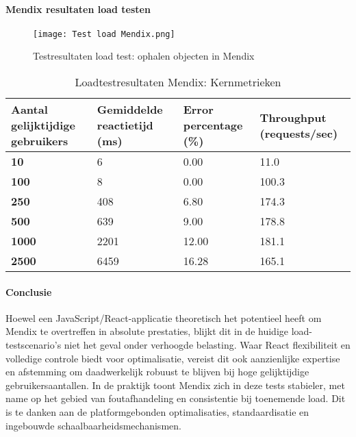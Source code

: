 \paragraph{Mendix resultaten load testen}

\begin{figure}[H]
    \centering
    \captionsetup{justification=centering}
    \texttt{[image: Test load Mendix.png]}
    \caption[\centering Testresultaten load test: ophalen objecten in Mendix]{\label{fig:loadtest-Mendix} Testresultaten load test: ophalen objecten in Mendix}
\end{figure}


\begin{table}[h]
    \centering
    \begin{tabular}{ |p{5cm}|p{3cm}|p{3cm}|p{3cm}|}
        \hline
        \textbf{Aantal gelijktijdige \newline gebruikers} & \textbf{Gemiddelde reactietijd (ms)} & \textbf{Error \newline percentage (\%)} & \textbf{Throughput (requests/sec)}\\
        \hline
        \textbf{10}  & 6 & 0.00 & 11.0 \\
        \hline
        \textbf{100} & 8 & 0.00 & 100.3 \\
        \hline
        \textbf{250}  & 408 & 6.80 & 174.3 \\
        \hline
        \textbf{500}  & 639 & 9.00 & 178.8 \\
        \hline                       
        \textbf{1000}  & 2201 & 12.00 & 181.1  \\
        \hline
        \textbf{2500}  & 6459 & 16.28 & 165.1 \\
        \hline
    \end{tabular}
    \caption[\centering Loadtestresultaten Mendix: Kernmetrieken]{\label{tab:Testresultaten Mendix loadtest}Loadtestresultaten Mendix: Kernmetrieken}
\end{table}



\paragraph{Conclusie}
Hoewel een JavaScript/React-applicatie theoretisch het potentieel heeft om Mendix te overtreffen in absolute prestaties, blijkt dit in de huidige load-testscenario’s niet het geval onder verhoogde belasting. Waar React flexibiliteit en volledige controle biedt voor optimalisatie, vereist dit ook aanzienlijke expertise en afstemming om daadwerkelijk robuust te blijven bij hoge gelijktijdige gebruikersaantallen. In de praktijk toont Mendix zich in deze tests stabieler, met name op het gebied van foutafhandeling en consistentie bij toenemende load. Dit is te danken aan de platformgebonden optimalisaties, standaardisatie en ingebouwde schaalbaarheidsmechanismen.

